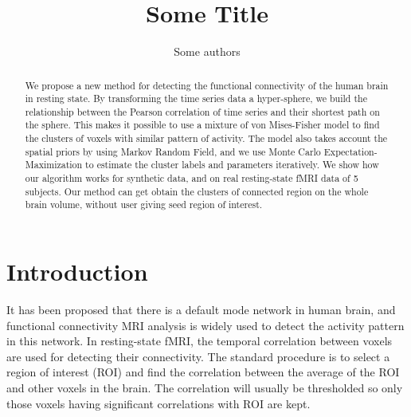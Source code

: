 \documentclass[runningheads,a4paper]{llncs}
\begin{document}
\mainmatter  %

\title{Some Title}


%
%
\author{Some authors}
%


%
%

\maketitle


\begin{abstract}
We propose a new method for detecting the functional connectivity of
the human brain in resting state. By transforming the time series data
a hyper-sphere, we build the relationship between the Pearson
correlation of time series and their shortest path on the sphere. This
makes it possible to use a mixture of von Mises-Fisher model to find
the clusters of voxels with similar pattern of activity. The model
also takes account the spatial priors by using Markov Random Field,
and we use Monte Carlo Expectation-Maximization to estimate the
cluster labels and parameters iteratively. We show how our algorithm
works for synthetic data, and on real resting-state fMRI data of 5
subjects. Our method can get obtain the clusters of connected region
on the whole brain volume, without user giving seed region of
interest.
\end{abstract}

\section{Introduction}
It has been proposed that there is a default mode network in human
brain, and functional connectivity MRI analysis is widely used to
detect the activity pattern in this network. In resting-state fMRI,
the temporal correlation between voxels are used for detecting their
connectivity. The standard procedure is to select a region of interest
(ROI) and find the correlation between the average of the ROI and
other voxels in the brain.  The correlation will usually be
thresholded so only those voxels having significant correlations with
ROI are kept.
\end{document}
